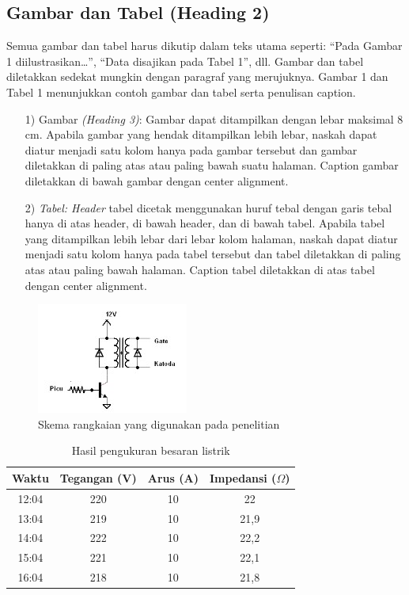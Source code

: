 \documentclass[eng]{JuLIET-class}
\begin{document}
	\subsection{Gambar dan Tabel (Heading 2)}
	Semua gambar dan tabel harus dikutip dalam teks utama seperti: “Pada Gambar 1 diilustrasikan…”, “Data disajikan pada Tabel 1”, dll. Gambar dan tabel diletakkan sedekat mungkin dengan paragraf yang merujuknya. Gambar 1 dan Tabel 1 menunjukkan contoh gambar dan tabel serta penulisan caption.
	\begin{enumerate}[wide, labelwidth=!, labelindent=0pt]
		\item [1)] Gambar \textit{(Heading 3)}: Gambar dapat ditampilkan dengan lebar maksimal 8 cm. Apabila gambar yang hendak ditampilkan lebih lebar, naskah dapat diatur menjadi satu kolom hanya pada gambar tersebut dan gambar diletakkan di paling atas atau paling bawah suatu halaman. Caption gambar diletakkan di bawah gambar dengan center alignment.
		\item [2)] \textit{Tabel: Header} tabel dicetak menggunakan huruf tebal dengan garis tebal hanya di atas header, di bawah header, dan di bawah tabel. Apabila tabel yang ditampilkan lebih lebar dari lebar kolom halaman, naskah dapat diatur menjadi satu kolom hanya pada tabel tersebut dan tabel diletakkan di paling atas atau paling bawah halaman. Caption tabel diletakkan di atas tabel dengan center alignment.
	\end{enumerate}
	\begin{figure}[H]
		\centering
		\includegraphics[scale=1]{Gambar/Gambar1.jpg}
		\caption{Skema rangkaian yang digunakan pada penelitian}
		\label{gambar_rangkaian}
	\end{figure}
	
	\begin{table}[H]
		\centering
		\caption{Hasil pengukuran besaran listrik}
		\begin{tabular}{@{}cccc@{}}
			\toprule
			Waktu & Tegangan (V) & Arus (A) & Impedansi ($\Omega$) \\ \midrule
			12:04 & 220 & 10 & 22 \\
			13:04 & 219 & 10 & 21,9 \\
			14:04 & 222 & 10 & 22,2 \\
			15:04 & 221 & 10 & 22,1 \\
			16:04 & 218 & 10 & 21,8 \\ \bottomrule
		\end{tabular}
	\end{table}
\end{document}
